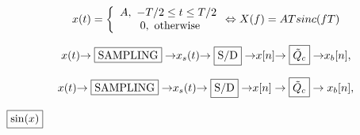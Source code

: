\documentclass{article}
\begin{document}
\begin{equation}
    x(t) = \left\{ {\begin{array}{*{20}c} {A,~-T/2 \le t \le T/2} \\ {~ 0,{~\textrm{otherwise}}} \\ \end{array} \Leftrightarrow } \right. X(f) = A T sinc(fT)
    \label{eq:sinc_transform}
    \end{equation}


\[
x(t) {\rightarrow\fbox{SAMPLING}\rightarrow} x_s(t) {\rightarrow\fbox{S/D}\rightarrow} x[n] {\rightarrow\fbox{{$\tilde{Q}_c$}}\rightarrow} x_b[n],
\]

\[
x(t) {\rightarrow\fbox{SAMPLING}\rightarrow} x_s(t) {\rightarrow\fbox{S/D}\rightarrow} x[n] \rightarrow\boxed{\tilde{Q}_c}\rightarrow x_b[n],
\]

$\fbox{$\sin(x)$}$
\end{document}
